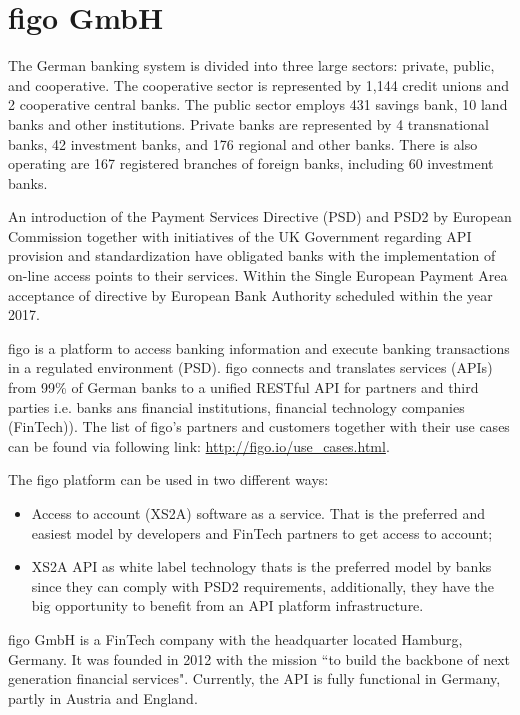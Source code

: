 \chapter{figo GmbH}
\label{chaper:figo}
The German banking system is divided into three large sectors: private, public, and cooperative. The cooperative sector is represented by 1,144 credit unions and 2 cooperative central banks. The public sector employs 431 savings bank, 10 land banks and other institutions. Private banks are represented by 4 transnational banks, 42 investment banks, and 176 regional and other banks. There is also operating are 167 registered branches of foreign banks, including 60 investment banks\cite{listOfBanks}.   

An introduction of the Payment Services Directive (PSD) and PSD2 by European Commission together with initiatives of the UK Government regarding API provision and standardization have obligated banks with the implementation of on-line access points to their services\cite{LarsAPI}\cite{TimAPI}\cite{DaveAPI}. Within the Single European Payment Area acceptance of directive by European Bank Authority scheduled within the year 2017\cite{PSD2}.



figo is a platform to access banking information and execute banking transactions in a regulated environment (PSD).  figo connects and translates services (APIs) from 99\% of German banks to a unified RESTful API for partners and third parties i.e. banks ans financial institutions, financial technology companies (FinTech))\cite{figoAngel}\cite{figoCB}\cite{figoFAQWhat}\cite{figoFAQVision}\cite{figoFAQPartners}.
The list of figo's partners and customers  together with their use cases can be found via following link: \url{http://figo.io/use\_cases.html}.

The figo platform can be used in two different ways: 
\begin{itemize}
	\item Access to account (XS2A) software as a service. That is the preferred and easiest model by developers and FinTech partners to get access to account;
	\item XS2A API as white label technology  thats is the preferred model by banks since they can comply with PSD2 requirements, additionally, they have the big opportunity to benefit from an API platform infrastructure. 
\end{itemize}

figo GmbH is a FinTech company with the headquarter located Hamburg, Germany. It was founded in 2012  with the mission “to build the backbone of next generation financial services"\cite{figoFAQVision}.  Currently, the API is fully functional in Germany, partly in Austria and England\cite{figoAngel}\cite{figoCB}.


